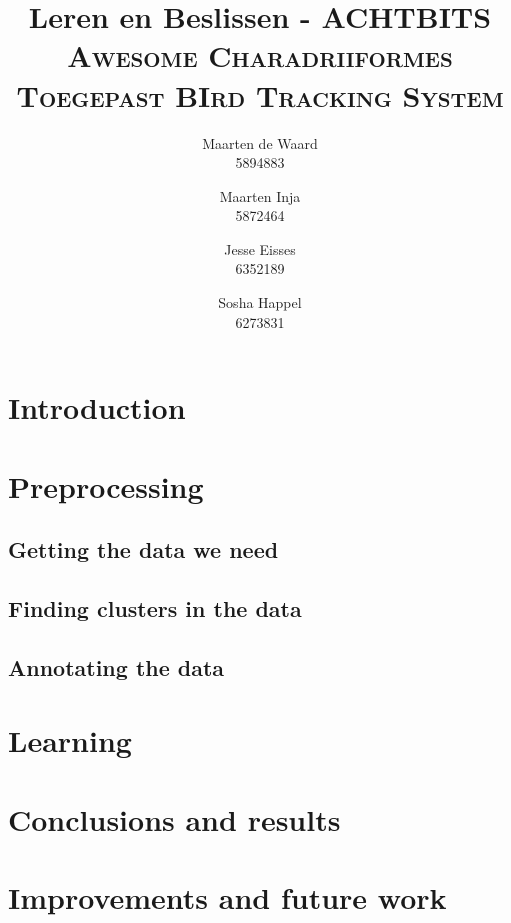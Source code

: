 \documentclass[a4paper,10pt]{article}
\title{Leren en Beslissen - ACHTBITS\\\large \textsc{Awesome Charadriiformes Toegepast
BIrd Tracking System}}
\author{Maarten de Waard\\5894883 \and Maarten Inja \\5872464 \and Jesse Eisses \\
6352189 \and Sosha Happel\\ 6273831}
\begin{document}
\maketitle
\section{Introduction}

\section{Preprocessing}
 \subsection{Getting the data we need}
 
 \subsection{Finding clusters in the data}
 
 \subsection{Annotating the data}


\section{Learning}

\section{Conclusions and results}

\section{Improvements and future work}
\end{document}
